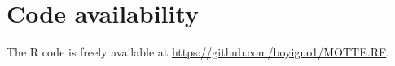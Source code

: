 \documentclass[smallextended]{svjour3}
\begin{document}
\section*{Code availability }
The R code is  freely available at
\url{https://github.com/boyiguo1/MOTTE.RF}.




\clearpage
\end{document}
